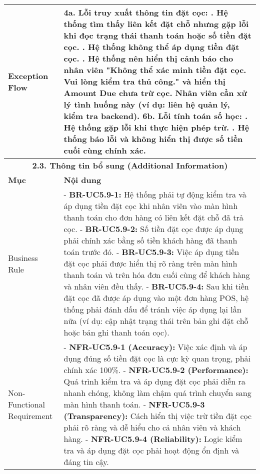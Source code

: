 \begin{longtable}{|m{4cm}|p{11cm}|}
\hline
Exception Flow & \textbf{4a. Lỗi truy xuất thông tin đặt cọc:} \newline    1. Hệ thống tìm thấy liên kết đặt chỗ nhưng gặp lỗi khi đọc trạng thái thanh toán hoặc số tiền đặt cọc. \newline    2. Hệ thống không thể áp dụng tiền đặt cọc. \newline    3. Hệ thống nên hiển thị cảnh báo cho nhân viên "Không thể xác minh tiền đặt cọc. Vui lòng kiểm tra thủ công." và hiển thị Amount Due chưa trừ cọc. Nhân viên cần xử lý tình huống này (ví dụ: liên hệ quản lý, kiểm tra backend). \newline \textbf{6b. Lỗi tính toán số học:} \newline    1. Hệ thống gặp lỗi khi thực hiện phép trừ. \newline    2. Hệ thống báo lỗi và không hiển thị được số tiền cuối cùng chính xác. \\
\hline
\multicolumn{2}{|c|}{\textbf{2.3. Thông tin bổ sung (Additional Information)}} \\
\hline
\textbf{Mục} & \textbf{Nội dung} \\
\hline
Business Rule & - \textbf{BR-UC5.9-1:} Hệ thống phải tự động kiểm tra và áp dụng tiền đặt cọc khi nhân viên vào màn hình thanh toán cho đơn hàng có liên kết đặt chỗ đã trả cọc. \newline - \textbf{BR-UC5.9-2:} Số tiền đặt cọc được áp dụng phải chính xác bằng số tiền khách hàng đã thanh toán trước đó. \newline - \textbf{BR-UC5.9-3:} Việc áp dụng tiền đặt cọc phải được hiển thị rõ ràng trên màn hình thanh toán và trên hóa đơn cuối cùng để khách hàng và nhân viên đều thấy. \newline - \textbf{BR-UC5.9-4:} Sau khi tiền đặt cọc đã được áp dụng vào một đơn hàng POS, hệ thống phải đánh dấu để tránh việc áp dụng lại lần nữa (ví dụ: cập nhật trạng thái trên bản ghi đặt chỗ hoặc bản ghi thanh toán cọc). \\
\hline
Non-Functional Requirement & - \textbf{NFR-UC5.9-1 (Accuracy):} Việc xác định và áp dụng đúng số tiền đặt cọc là cực kỳ quan trọng, phải chính xác 100\%. \newline - \textbf{NFR-UC5.9-2 (Performance):} Quá trình kiểm tra và áp dụng đặt cọc phải diễn ra nhanh chóng, không làm chậm quá trình chuyển sang màn hình thanh toán. \newline - \textbf{NFR-UC5.9-3 (Transparency):} Cách hiển thị việc trừ tiền đặt cọc phải rõ ràng và dễ hiểu cho cả nhân viên và khách hàng. \newline - \textbf{NFR-UC5.9-4 (Reliability):} Logic kiểm tra và áp dụng đặt cọc phải hoạt động ổn định và đáng tin cậy. \\
\hline
\end{longtable}

